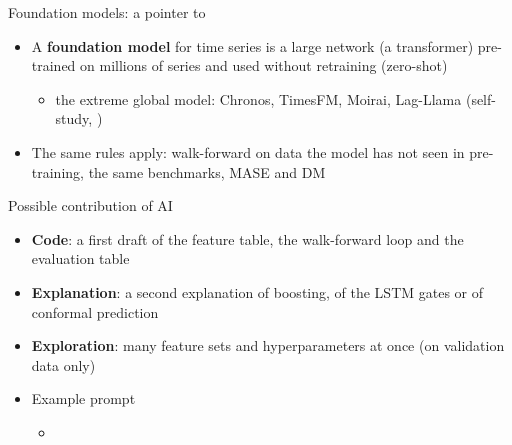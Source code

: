 \begin{frame}{Foundation models: a pointer to }
\itemsize{\small}
\begin{itemize}
    \item A \textbf{foundation model} for time series is a large network (a transformer) pre-trained on millions of series and used without retraining (zero-shot)
    \begin{itemize}
        \item the extreme global model: Chronos, TimesFM, Moirai, Lag-Llama (self-study, )
    \end{itemize}
    \item The same rules apply: walk-forward on data the model has not seen in pre-training, the same benchmarks, MASE and DM
\end{itemize}
\end{frame}

\begin{frame}{Possible contribution of AI}
\itemsize{\small}
\begin{itemize}
    \item \textbf{Code}: a first draft of the feature table, the walk-forward loop and the evaluation table
    \item \textbf{Explanation}: a second explanation of boosting, of the LSTM gates or of conformal prediction
    \item \textbf{Exploration}: many feature sets and hyperparameters at once (on validation data only)
    \item Example prompt
    \begin{itemize}
        \item {}
    \end{itemize}
\end{itemize}
\end{frame}

